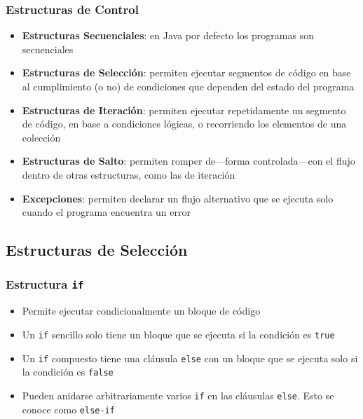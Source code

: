 \documentclass{beamer}
\newcommand{\code}[1]{\texttt{#1}}
\begin{document}
\begin{frame}
  \frametitle{Estructuras de Control}

  \begin{itemize}
    
  \item \textbf{Estructuras Secuenciales}: en Java por defecto los programas
    son secuenciales
    
  \item \textbf{Estructuras de Selección}: permiten ejecutar segmentos de
    código en base al cumplimiento (o no) de condiciones que dependen
    del estado del programa
    
  \item \textbf{Estructuras de Iteración}: permiten ejecutar repetidamente un
    segmento de código, en base a condiciones lógicas, o recorriendo
    los elementos de una colección

    
  \item \textbf{Estructuras de Salto}: permiten romper de---forma
    controlada---con el flujo dentro de otras estructuras, como las de
    iteración
    
  \item \textbf{Excepciones}: permiten declarar un flujo alternativo
    que se ejecuta solo cuando el programa encuentra un error
    
  \end{itemize} 

\end{frame}

\subsection{Estructuras de Selección}

\begin{frame}
  \frametitle{Estructura \code{if}}

  \begin{itemize}
  \item Permite ejecutar condicionalmente un bloque de código
    
  \item Un \code{if} sencillo solo tiene un bloque que se ejecuta si
    la condición es \code{true}
    
  \item Un \code{if} compuesto tiene una cláusula \code{else} con un
    bloque que se ejecuta solo si la condición es \code{false}
    
  \item Pueden anidarse arbitrariamente varios \code{if} en las
    cláusulas \code{else}. Esto se conoce como \code{else-if}
    
  \end{itemize}
\end{frame}
\end{document}
